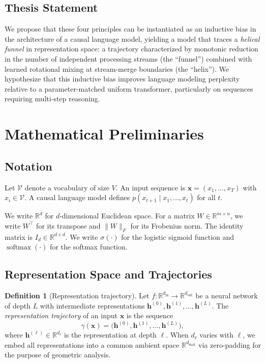 \documentclass[11pt,a4paper]{article}
\theoremstyle{definition}
\newtheorem{definition}{Definition}[section]
\theoremstyle{plain}
\theoremstyle{remark}
\newcommand{\R}{\mathbb{R}}
\newcommand{\Vcal}{\mathcal{V}}
\newcommand{\softmax}{\operatorname{softmax}}
\newcommand{\sigmoid}{\sigma}
\begin{document}
\subsection{Thesis Statement}

We propose that these four principles can be instantiated as an inductive 
bias in the architecture of a causal language model, yielding a model 
that traces a \emph{helical funnel} in representation space: a trajectory 
characterized by monotonic reduction in the number of independent 
processing streams (the ``funnel'') combined with learned rotational mixing 
at stream-merge boundaries (the ``helix''). We hypothesize that this 
inductive bias improves language modeling perplexity relative to a 
parameter-matched uniform transformer, particularly on sequences requiring 
multi-step reasoning.

\section{Mathematical Preliminaries}\label{sec:prelim}

\subsection{Notation}

Let $\Vcal$ denote a vocabulary of size $V$. An input sequence is 
$\mathbf{x} = (x_1, \ldots, x_T)$ with $x_i \in \Vcal$. A causal 
language model defines $p(x_{t+1} \mid x_1, \ldots, x_t)$ for all $t$.

We write $\R^{d}$ for $d$-dimensional Euclidean space. For a matrix 
$W \in \R^{m \times n}$, we write $W^\top$ for its transpose and 
$\|W\|_F$ for its Frobenius norm. The identity matrix is $I_d \in 
\R^{d \times d}$. We write $\sigmoid(\cdot)$ for the logistic sigmoid 
function and $\softmax(\cdot)$ for the softmax function.

\subsection{Representation Space and Trajectories}\label{sec:rep-traj}

\begin{definition}[Representation trajectory]\label{def:rep-traj}
Let $f: \R^{d_{\text{in}}} \to \R^{d_{\text{out}}}$ be a neural network 
of depth $L$ with intermediate representations $\mathbf{h}^{(0)}, 
\mathbf{h}^{(1)}, \ldots, \mathbf{h}^{(L)}$. The \emph{representation 
trajectory} of an input $\mathbf{x}$ is the sequence
\[
  \gamma(\mathbf{x}) = \bigl(\mathbf{h}^{(0)}, \mathbf{h}^{(1)}, \ldots, 
  \mathbf{h}^{(L)}\bigr),
\]
where $\mathbf{h}^{(\ell)} \in \R^{d_\ell}$ is the representation at 
depth $\ell$. When $d_\ell$ varies with $\ell$, we embed all 
representations into a common ambient space $\R^{d_{\max}}$ via 
zero-padding for the purpose of geometric analysis.
\end{definition}
\end{document}
